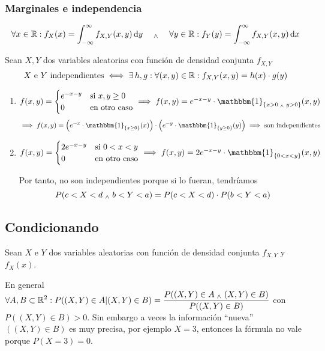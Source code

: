 \subsubsection{Marginales e independencia}

\[\forall x \in \R : f_{X} (x) = \int_{-\infty}^{\infty} f_{X, Y}(x, y) \odif{y} \quad \we \quad \forall y \in \R :  f_{Y} (y) = \int_{-\infty}^{\infty} f_{X, Y}(x, y) \odif{x}\]

\begin{teo}
	Sean $X, Y$ dos variables aleatorias con función de densidad conjunta $f_{X, Y}$
	\[ X \text{ e } Y \text{ independientes} \iff \exists \, h, g : \forall (x, y) \in \mathbb{R} : f_{X, Y}(x, y) = h(x) \cdot g(y)\]
\end{teo}

\begin{ejem}
	\begin{enumerate}
		\item $f(x, y) = \begin{cases}
				      e^{-x-y} & \text{si } x, y \geq 0 \\
				      0        & \text{en otro caso}
			      \end{cases} \implies f(x, y) = e^{-x-y} \cdot \mathbbm{1}_{\{x>0 \we y>0\}}(x, y)$
		      \[\implies f(x, y) = \left(e^{-x} \cdot \mathbbm{1}_{\{x\geq 0\}}(x)\right) \cdot \left(e^{-y} \cdot \mathbbm{1}_{\{y\geq 0\}}(y)\right) \implies \tex{son independientes}\]
		\item $f(x, y) = \begin{cases}
				      2e^{-x-y} & \text{si } 0 < x < y \\
				      0         & \text{en otro caso}
			      \end{cases} \implies f(x, y) = 2e^{-x-y} \cdot \mathbbm{1}_{\{0<x<y\}}(x, y)$

		      Por tanto, no son independientes porque si lo fueran, tendríamos
		      \[P(c < X < d \; _{\wedge} \; b < Y < a) = P(c < X < d) \cdot P(b < Y < a)\]
	\end{enumerate}
\end{ejem}

\subsection{Condicionando}

Sean $X$ e $Y$ dos variables aleatorias con función de densidad conjunta $f_{X, Y}$ y $f_X(x)$.

En general $\displaystyle \forall A, B \subset \mathbb{R}^2 : P((X, Y) \in A \vert (X, Y) \in B) = \frac{P((X, Y) \in A \; _{\wedge} \; (X, Y) \in B)}{P((X, Y) \in B)}$ con $P((X, Y) \in B) > 0$. Sin embargo a veces la información ``nueva'' $((X, Y)\in B)$ es muy precisa, por ejemplo $X=3$, entonces la fórmula no vale porque $P(X=3) = 0$.

